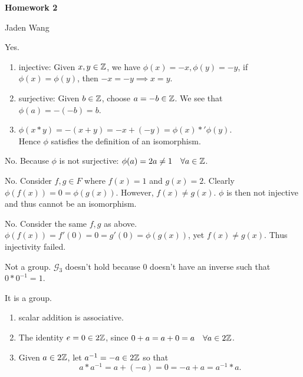 \documentclass[12pt]{article}
\begin{document}
\centerline {\textsf{\textbf{\LARGE{Homework 2}}}}
\centerline {Jaden Wang}
\vspace{.15in}

\begin{problem}[3.2]
Yes.
\begin{enumerate}[label=\roman*)]
	\item injective: Given $x,y \in \mathbb{Z}$, we have $\phi(x) =-x,\phi(y) =-y$, if $\phi(x) =\phi(y) $, then $-x = -y \implies x =y$.
	\item surjective: Given $b \in \mathbb{Z}$, choose $a =-b \in \mathbb{Z}$. We see that $\phi(a) = -(-b) = b$.
	\item $\phi(x*y) = -(x+y) = -x + (-y) = \phi(x) *' \phi(y) $. \\

Hence $\phi $ satisfies the definition of an isomorphism.
\end{enumerate}
\end{problem}

\begin{problem}[3.3]
No. Because $\phi$ is not surjective: $\phi(a) = 2a \neq 1 \quad \forall a \in \mathbb{Z}$.
\end{problem}

\begin{problem}[3.11]
No. Consider $f,g \in F$ where $f(x) = 1$ and  $g(x) = 2$. Clearly  $\phi(f(x)) =0 = \phi(g(x)) $. However, $f(x) \neq g(x)$.  $\phi$ is then not injective and thus cannot be an isomorphism.
\end{problem}

\begin{problem}[3.12]
	No. Consider the same $f,g$ as above. $\phi(f(x)) =f'(0) = 0 = g'(0) = \phi(g(x)) $, yet $f(x) \neq g(x)$. Thus injectivity failed.
\end{problem}

\begin{problem}[4.1]
Not a group. $\mathcal{G}_3$ doesn't hold because $0$ doesn't have an inverse such that $0 * 0^{-1} = 1$.
\end{problem}

\begin{problem}[4.2]
It is a group.
\begin{enumerate}[label=(\roman*)]
	\item scalar addition is associative.
	\item The identity $e = 0 \in 2\mathbb{Z}$, since $0 + a = a+ 0 = a \quad \forall a \in 2\mathbb{Z}$.
	\item Given $a \in 2\mathbb{Z}$, let $a^{-1} = - a \in 2\mathbb{Z}$ so that 
\[
		a*a^{-1}=a+(-a)=0=-a+a=a^{-1} * a
.\]
\end{enumerate}
\end{problem}
\end{document}
